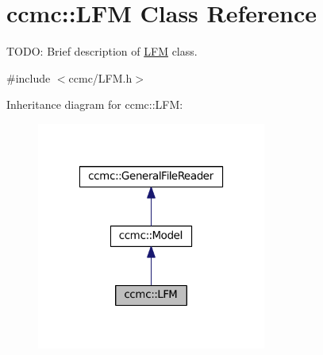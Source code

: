 \hypertarget{classccmc_1_1_l_f_m}{\section{ccmc\-:\-:L\-F\-M Class Reference}
\label{classccmc_1_1_l_f_m}
}


T\-O\-D\-O\-: Brief description of \hyperlink{classccmc_1_1_l_f_m}{L\-F\-M} class.  




{\ttfamily \#include $<$ccmc/\-L\-F\-M.\-h$>$}



Inheritance diagram for ccmc\-:\-:L\-F\-M\-:
\nopagebreak
\begin{figure}[H]
\begin{center}
\leavevmode
\includegraphics[width=214pt]{classccmc_1_1_l_f_m__inherit__graph}
\end{center}
\end{figure}


